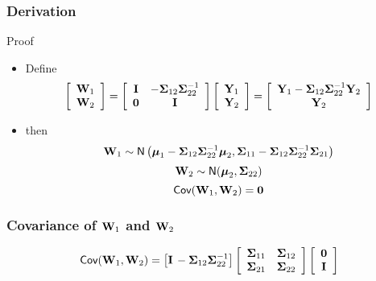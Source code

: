 \documentclass[handout]{beamer}
\begin{document}
\begin{frame}
  \frametitle{Derivation}
  \begin{block}{Proof}
    \begin{itemize}
    \item Define
$$  \left[
  \begin{array}{c}
\mathbf{W}_1  \\ \mathbf{W}_2 \end{array} \right] =  \left[ \begin{array}{cc}
\mathbf{I} & -\boldsymbol{\Sigma}_{12} \boldsymbol{\Sigma}_{22}^{-1}  \\ \mathbf{0} & \mathbf{I} \end{array} \right]  \left[
  \begin{array}{c}
\mathbf{Y}_1  \\ \mathbf{Y}_2 \end{array} \right] =  \left[
  \begin{array}{c}
\mathbf{Y}_1 - \boldsymbol{\Sigma}_{12} \boldsymbol{\Sigma}_{22}^{-1} \mathbf{Y}_2  \\ \mathbf{Y}_2 \end{array} \right]
 $$
\pause
\item  then
$$\mathbf{W}_1 \sim \textsf{N}\left( \boldsymbol{\mu}_1 - \boldsymbol{\Sigma}_{12} \boldsymbol{\Sigma}_{22}^{-1} \boldsymbol{\mu}_2,
\boldsymbol{\Sigma}_{11} - \boldsymbol{\Sigma}_{12}\boldsymbol{\Sigma}_{22}^{-1} \boldsymbol{\Sigma}_{21} \right) $$ \pause
$$\mathbf{W}_2 \sim \textsf{N}(\boldsymbol{\mu}_2, \boldsymbol{\Sigma}_{22})$$ \pause
$$\textsf{Cov}(\mathbf{W}_1, \mathbf{W}_2) = \mathbf{0}$$
  \end{itemize}
  \end{block}
\end{frame}
\begin{frame}
  \frametitle{Covariance of $\mathbf{W}_1$ and $\mathbf{W}_2$}
  \begin{block}{}

    $$\textsf{Cov}(\mathbf{W}_1, \mathbf{W}_2) = \left[\mathbf{I} \, -\boldsymbol{\Sigma}_{12}
        \boldsymbol{\Sigma}_{22}^{-1} \right]   \left[ \begin{array}{cc}
\boldsymbol{\Sigma}_{11} &  \boldsymbol{\Sigma}_{12}  \\
\boldsymbol{\Sigma}_{21} & \boldsymbol{\Sigma}_{22} \end{array} \right] \left[
\begin{array}{c} \mathbf{0} \\ \mathbf{I} \end{array}
\right] $$
  \end{block}

  \vspace{3in}
\end{frame}
\end{document}
